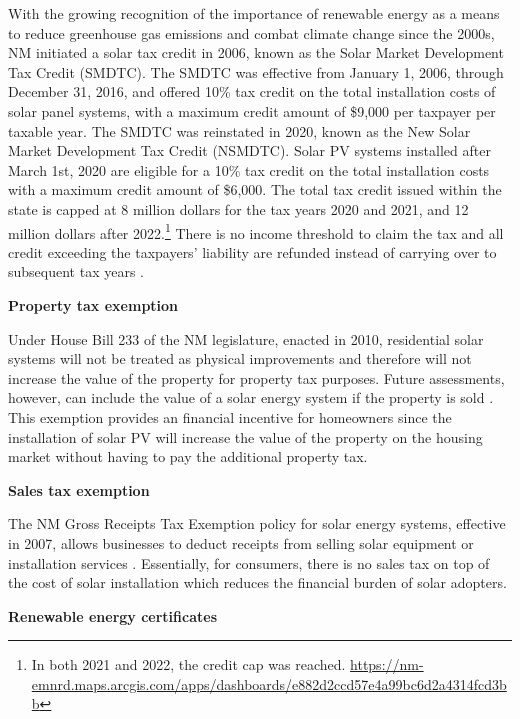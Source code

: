 \documentclass[12pt,twoside,letterpaper]{article}
\begin{document}
With the growing recognition of the importance of renewable energy as a means to reduce greenhouse gas emissions and combat climate change since the 2000s, NM initiated a solar tax credit in 2006, known as the Solar Market Development Tax Credit (SMDTC). The SMDTC was effective from January 1, 2006, through December 31, 2016, and offered 10\% tax credit on the total installation costs of solar panel systems, with a maximum credit amount of \$9,000 per taxpayer per taxable year. The SMDTC was reinstated in 2020, known as the New Solar Market Development Tax Credit (NSMDTC). Solar PV systems installed after March 1st, 2020 are eligible for a 10\% tax credit on the total installation costs with a maximum credit amount of \$6,000. The total tax credit issued within the state is capped at 8 million dollars for the tax years 2020  and 2021, and 12 million dollars after 2022.\footnote{In both 2021 and 2022, the credit cap was reached. \url{https://nm-emnrd.maps.arcgis.com/apps/dashboards/e882d2ccd57e4a99bc6d2a4314fcd3bb}} There is no income threshold to claim the tax and all credit exceeding the taxpayers' liability are refunded instead of carrying over to subsequent tax years \parencite{nmsmdtc}. 

\noindent\textbf{Property tax exemption}

Under House Bill 233 of the NM legislature, enacted in 2010, residential solar systems will not be treated as physical improvements and therefore will not increase the value of the property for property tax purposes. Future assessments, however, can include the value of a solar energy system if the property is sold \parencite{propertytax}. This exemption provides an financial incentive for homeowners since the installation of solar PV will increase the value of the property on the housing market without having to pay the additional property tax.


\noindent\textbf{Sales tax exemption}

The NM Gross Receipts Tax Exemption policy for solar energy systems, effective in 2007, allows businesses to deduct receipts from selling solar equipment or installation services
\parencite{NMStat2021}. Essentially, for consumers, there is no sales tax on top of the cost of solar installation which reduces the financial burden of solar adopters.


\noindent\textbf{Renewable energy certificates}
\end{document}
